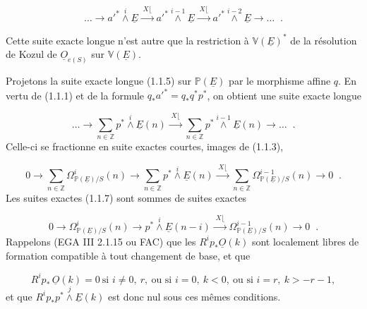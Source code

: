\begin{equation}\tag{1.1.5}
\ldots \longrightarrow {a'}^{*} \overset{i}{\wedge} \underline{E} \xrightarrow{\;X\lfloor\;} {a'}^{*} \overset{i-1}{\wedge} \underline{E} \xrightarrow{\;X\lfloor\;} {a'}^{*} \overset{i-2}{\wedge} \underline{E} \longrightarrow \ldots \;\; .
\end{equation}


Cette suite exacte longue n'est autre que la restriction à $\mathbb{V}(\underline{E})^*$ de la résolution de Kozul de $\underline{O}_{e(S)}$ sur $\mathbb{V}(\underline{E})$.

Projetons la suite exacte longue (1.1.5) sur $\mathbb{P}(\underline{E})$ par le morphisme affine $q$. En vertu de (1.1.1) et de la formule $q_*{a'}^{*} = q_*q^*p^*$, on obtient une suite exacte longue

\begin{equation}\tag{1.1.6}
\ldots \longrightarrow \sum_{n \in \mathbb{Z}} p^* \overset{i}{\wedge} \underline{E}(n) \xrightarrow{\;X\lfloor\;} \sum_{n \in \mathbb{Z}} p^* \overset{i-1}{\wedge} \underline{E}(n) \longrightarrow \ldots \;\; .
\end{equation}
Celle-ci se fractionne en suite exactes courtes, images de (1.1.3),

\begin{equation}\tag{1.1.7}
0 \longrightarrow \sum_{n \in \mathbb{Z}} \Omega^i_{\mathbb{P}(\underline{E})/S}(n) \longrightarrow \sum_{n \in \mathbb{Z}} p^* \overset{i}{\wedge} \underline{E}(n) \xrightarrow{\;X\lfloor\;} \sum_{n \in \mathbb{Z}} \Omega^{i-1}_{\mathbb{P}(\underline{E})/S}(n) \to 0 \;\; .
\end{equation}
Les suites exactes (1.1.7) sont sommes de suites exactes

\begin{equation}\tag{1.1.8}
0 \longrightarrow \Omega^i_{\mathbb{P}(\underline{E})/S}(n) \longrightarrow p^* \overset{i}{\wedge} \underline{E}(n-i) \xrightarrow{\;X\lfloor\;} \Omega^{i-1}_{\mathbb{P}(\underline{E})/S}(n) \longrightarrow 0 \;\; .
\end{equation}
Rappelons (EGA III 2.1.15 ou FAC) que les $R^i p_* \underline{O}(k)$ sont localement libres de formation compatible à tout changement de base, et que

\begin{equation}\tag{1.1.9}
R^i p_* \, \underline{O}(k) = 0 \ \text{si } i \neq 0,\ r, \ \text{ou si } i = 0,\ k < 0, \ \text{ou si } i = r,\ k > -r-1,
\end{equation}
et que $R^i p_* p^* \overset{j}{\wedge} \underline{E}(k)$ est donc nul sous ces mêmes conditions.

